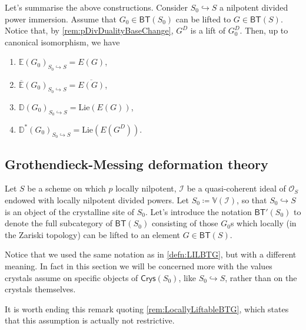 \begin{rem}[]
	Let's summarise the above constructions.
	Consider $S_0 \hookrightarrow S$ a nilpotent divided power immersion.
	Assume that $G_0 \in \mathsf{BT}(S_0)$ can be lifted to $G \in \mathsf{BT}(S)$.
	Notice that, by \cref{rem:pDivDualityBaseChange}, $G^D$ is a lift of $G_0^D$.
	Then, up to canonical isomorphism, we have
\begin{enumerate}
	\item $\mathbb{E}(G_0)_{S_0 \hookrightarrow S} = E(G)$,
	\item $\overline{\mathbb{E}}(G_0)_{S_0 \hookrightarrow S} = \overline{E(G)}$,
	\item $\mathbb{D}(G_0)_{S_0 \hookrightarrow S} = 
		\mathrm{Lie}(E(G))$,
	\item $\mathbb{D}^*(G_0)_{S_0 \hookrightarrow S} = \mathrm{Lie}(E(G^D))$.
\end{enumerate}
\end{rem}



\subsection{Grothendieck-Messing deformation theory}


\begin{ntt}
	Let $S$ be a scheme on which $p$ locally nilpotent, $\mathcal{I}$
	be a quasi-coherent ideal of $\mathcal{O}_{ S }$ endowed with locally nilpotent
	divided powers.
	Let $S_0 \coloneqq \mathbb{V}(\mathcal{I})$,
	so that $S_0 \hookrightarrow S$ is an object of the crystalline site of $S_0$.
	Let's introduce the notation $\mathsf{BT}'(S_0)$ to denote the full subcategory of
	$\mathsf{BT}(S_0)$ consisting of those $G_0$s which locally (in
	the Zariski topology) can be lifted to an element $G \in \mathsf{BT}(S)$.
\end{ntt} 


\begin{rem}[]
	Notice that we used the same notation as in \cref{defn:LILBTG}, but with
	a different meaning.
	In fact in this section we will be concerned more with the values crystals
	assume on specific objects of $\mathsf{Crys}(S_0)$, like $S_0 \hookrightarrow S$,
	rather than on the crystals themselves.

	It is worth ending this remark quoting \cref{rem:LocallyLiftableBTG},
	which states that this assumption is actually not restrictive.
\end{rem}


